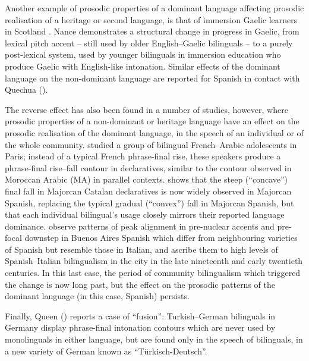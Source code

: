 \documentclass[output=paper]{langsci/langscibook}
\begin{document}
Another example of prosodic properties of a dominant language affecting prosodic realisation of a heritage or second language, is that of immersion Gaelic learners in Scotland \citep{Nance2015}. Nance demonstrates a structural change in progress in Gaelic, from lexical pitch accent – still used by older English--Gaelic bilinguals – to a purely post-lexical system, used by younger bilinguals in immersion education who produce Gaelic with English-like intonation.  Similar effects of the dominant language on the non-dominant language are reported for Spanish in contact with Quechua (\citealt{ORourke2004}).  

The reverse effect has also been found in a number of studies, however, where prosodic properties of a non-dominant or heritage language have an effect on the prosodic realisation of the dominant language, in the speech of an individual or of the whole community. \citet{Fagyal2005} studied a group of bilingual French--Arabic adolescents in Paris; instead of a typical French phrase-final rise, these speakers produce a phrase-final rise--fall contour in declaratives, similar to the contour observed in Moroccan Arabic (MA) in parallel contexts. \citet{Simonet2011} shows that the steep (``concave'') final fall in Majorcan Catalan declaratives is now widely observed in Majorcan Spanish, replacing the typical gradual (``convex'') fall in Majorcan Spanish, but that each individual bilingual’s usage closely mirrors their reported language dominance. \citet{ColantoniGurlekian2004} observe patterns of peak alignment in pre-nuclear accents and pre-focal downstep in Buenos Aires Spanish which differ from neighbouring varieties of Spanish but resemble those in Italian, and ascribe them to high levels of Spanish--Italian bilingualism in the city in the late nineteenth and early twentieth centuries. In this last case, the period of community bilingualism which triggered the change is now long past, but the effect on the prosodic patterns of the dominant language (in this case, Spanish) persists.

Finally, Queen (\citeyear{Queen2001,Queen2012}) reports a case of ``fusion'': Turkish--German bilinguals in Germany display phrase-final intonation contours which are never used by monolinguals in either language, but are found only in the speech of bilinguals, in a new variety of German known as ``Türkisch-Deutsch''.
\end{document}
